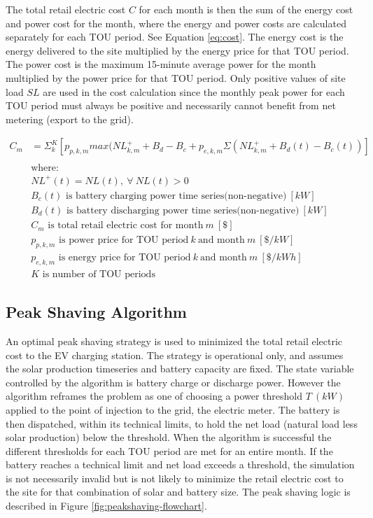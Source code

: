 \documentclass[
]{article}
\begin{document}
The total retail electric cost \(C\) for each month is then the sum of
the energy cost and power cost for the month, where the energy and power
costs are calculated separately for each TOU period. See Equation \ref{eq:cost}. The energy cost is
the energy delivered to the site multiplied by the energy price for that
TOU period. The power cost is the maximum 15-minute average power for
the month multiplied by the power price for that TOU period. Only
positive values of site load \(SL\) are used in the cost calculation
since the monthly peak power for each TOU period must always be positive
and necessarily cannot benefit from net metering (export to the grid).

\begin{equation}
  \label{eq:cost}
  \begin{split}
    C_m &= \Sigma_k^K [ p_{p,k,m} max(NL^+_{k,m} + B_d - B_c + p_{e,k,m} \Sigma (NL^+_{k,m} + B_d(t) - B_c(t)) ] \\
    \\
    & \text{where:} \\
    & NL^+(t) = NL(t),\ \forall\ NL(t)>0\\
    &B_c(t) \text{ is battery charging power time series(non-negative)}\ [kW]\\
    &B_d(t) \text{ is battery discharging power time series(non-negative)}\ [kW] \\
    &C_m \text{ is total retail electric cost for month}\ m\ [\$] \\
    &p_{p,k,m} \text{ is power price for TOU period}\ k\ \text{and month}\ m\  [\$/kW] \\
    &p_{e,k,m} \text{ is energy price for TOU period}\ k\ \text{and month}\ m\ [\$/kWh] \\
    &K \text{ is number of TOU periods}
  \end{split}
\end{equation}

\hypertarget{peak-shaving-algorithm}{%
  \subsection{Peak Shaving Algorithm}\label{peak-shaving-algorithm}}

An optimal peak shaving strategy is used to minimized the total retail
electric cost to the EV charging station. The strategy is operational
only, and assumes the solar production timeseries and battery capacity
are fixed. The state variable controlled by the algorithm is battery
charge or discharge power. However the algorithm reframes the problem as
one of choosing a power threshold \(T\ (kW)\) applied to the point of
injection to the grid, the electric meter. The battery is then
dispatched, within its technical limits, to hold the net load (natural
load less solar production) below the threshold. When the algorithm is
successful the different thresholds for each TOU period are met for an
entire month. If the battery reaches a technical limit and net load
exceeds a threshold, the simulation is not necessarily invalid but is
not likely to minimize the retail electric cost to the site for that
combination of solar and battery size. The peak shaving logic is
described in Figure \ref{fig:peakshaving-flowchart}.
\end{document}
